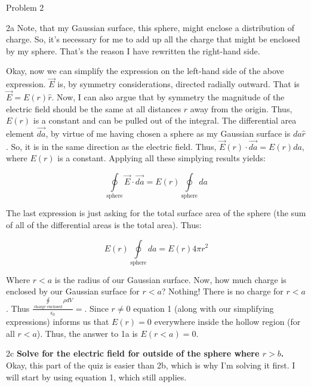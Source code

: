 \begin{homeworkProblem}{Problem 2}
\begin{homeworkSection}{2a}
        Note, that my Gaussian surface, this sphere, might enclose a
        distribution of charge. So, it's necessary for me to add up all
        the charge that might be enclosed by my sphere. That's the
        reason I have rewritten the right-hand side.

        Okay, now we can simplify the expression on the left-hand side
        of the above expression. $\vec{E}$ is, by symmetry
        considerations, directed radially outward. That is $\vec{E} =
        E(r) \hat{r}$. Now, I can also argue that by symmetry the
        magnitude of the electric field should be the same at all
        distances $r$ away from the origin. Thus, $E(r)$ is a constant
        and can be pulled out of the integral. The differential area
        element $\vec{da}$, by virtue of me having chosen a sphere as my
        Gaussian surface is $da \hat{r}$. So, it is in the same
        direction as the electric field. Thus, $\vec{E}(r) \cdot
        \vec{da} = E(r) da$, where $E(r)$ is a constant. Applying all
        these simplying results yields:

        \[
        \oint\limits_{\text{sphere}} \vec{E}\cdot\vec{da} = E(r)
        \oint\limits_{\text{sphere}} da
        \]

        The last expression is just asking for the total surface area of
        the sphere (the sum of all of the differential areas is the
        total area). Thus:
        
        \[
        E(r) \oint\limits_{\text{sphere}} da = E(r) 4\pi r^2
        \]

        Where $r<a$ is the radius of our Gaussian surface. Now, how much
        charge is enclosed by our Gaussian surface for $r<a$? Nothing!
        There is no charge for $r<a$. Thus
        $\frac{\oint\limits_{\text{charge enclosed}}\rho dV}{\epsilon_0} = $.
        Since $r \ne 0$ equation 1 (along with our simplifying
        expressions) informs us that $E(r)=0$ everywhere inside the
        hollow region (for all $r<a$). Thus, the answer to 1a is $E(r<a)
        = 0$.

    \end{homeworkSection}
    \begin{homeworkSection}{2c}
        \textbf{Solve for the electric field for outside of the sphere
        where $r>b$.}
        \\

        Okay, this part of the quiz is easier than 2b, which is why I'm
        solving it first. I will start by using equation 1, which still
        applies.
        

\end{homeworkSection}
\end{homeworkProblem}

